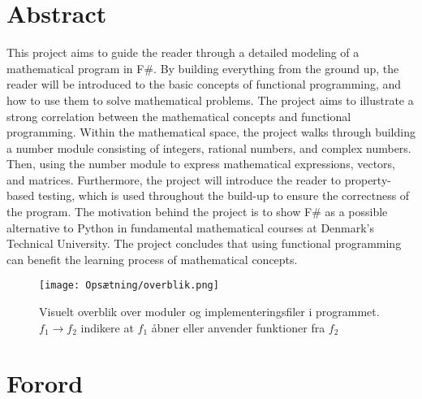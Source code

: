 \documentclass{article}
\newcommand{\newchapter}{
    \cleardoublepage
    \ifthenelse{\isodd{\value{page}}}{}{\hbox{}\newpage}
}
\begin{document}

\pagestyle{plain}

\section*{Abstract}
This project aims to guide the reader through a detailed modeling of a mathematical program in F\#. By building everything from the ground up, the reader will be introduced to the basic concepts of functional programming, and how to use them to solve mathematical problems. The project aims to illustrate a strong correlation between the mathematical concepts and functional programming. Within the mathematical space, the project walks through building a number module consisting of integers, rational numbers, and complex numbers. Then, using the number module to express mathematical expressions, vectors, and matrices. Furthermore, the project will introduce the reader to property-based testing, which is used throughout the build-up to ensure the correctness of the program. The motivation behind the project is to show F\# as a possible alternative to Python in fundamental mathematical courses at Denmark's Technical University. The project concludes that using functional programming can benefit the learning process of mathematical concepts.




\newpage
\begin{figure}[h]
    \centering
    \texttt{[image: Opsætning/overblik.png]}
    \caption{Visuelt overblik over moduler og implementeringsfiler i programmet. $f_1 \to f_2$ indikere at $f_1$ åbner eller anvender funktioner fra $f_2$}
    \label{fig:svg_example}
\end{figure}

\newchapter
\section*{Forord}


\newchapter
\tableofcontents
\newchapter

\newchapter

\newchapter

\newchapter

\newchapter

\newchapter


\newchapter



\newpage
\printbibliography

\newpage

\end{document}
